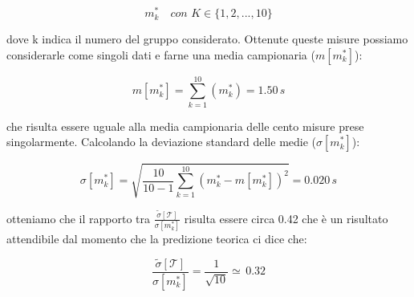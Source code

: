 \begin{equation}
m_k^* \quad con \,\, K \in{\{1,2,...,10\}}
\end{equation}

dove k indica il numero del gruppo considerato.
Ottenute queste misure possiamo considerarle come singoli dati e farne una media campionaria ($ m[m_k^*] $):

\begin{equation}
m[m_k^*] = \sum_{k=1}^{10} (m_k^*) = 1.50\,s
\end{equation}

che risulta essere uguale alla media campionaria delle cento misure prese singolarmente. Calcolando la deviazione standard delle medie ($ \sigma[m_k^*] $):

\begin{equation}
\sigma[m_k^*] = \sqrt{\frac{10}{10-1} \sum_{k=1}^{10} (m_k^* - m[m_k^*])^2} = 0.020\,s
\end{equation}

otteniamo che il rapporto tra $\frac{\tilde{\sigma}[\mathcal{T}]}{\sigma[m_k^*]}$ risulta essere circa 0.42 che è un risultato attendibile dal momento che la predizione teorica ci dice che:

\begin{equation}
\frac{\tilde{\sigma}[\mathcal{T}]}{\sigma[m_k^*]} = \frac{1}{\sqrt{10}} \simeq \, 0.32
\end{equation}

